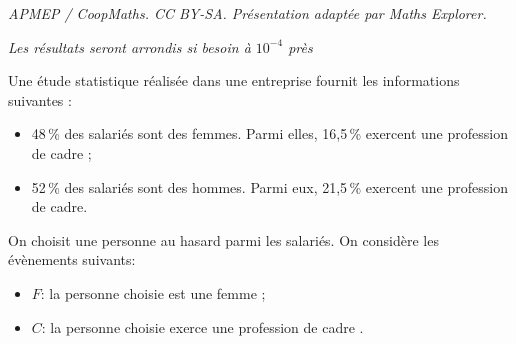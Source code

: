 \documentclass[10pt]{article}
\begin{document}
\noindent\textit{APMEP / CoopMaths. CC BY-SA. Présentation adaptée par Maths Explorer.}\par\medskip
\medskip

\emph{Les résultats seront arrondis si besoin à $10^{- 4}$ près}

\medskip

Une étude statistique réalisée dans une entreprise fournit les informations suivantes : 

\setlength\parindent{1cm}
\begin{itemize}
\item[$\bullet~~$] 48\,\% des salariés sont des femmes. Parmi elles, 16,5\,\% exercent une
profession de cadre ;
\item[$\bullet~~$] 52\,\% des salariés sont des hommes. Parmi eux, 21,5\,\% exercent une
profession de cadre.
\end{itemize}
\setlength\parindent{0cm}

\medskip

On choisit une personne au hasard parmi les salariés. On considère les évènements suivants:

\setlength\parindent{1cm}
\begin{itemize}
\item[$\bullet~~$] $F$: \og la personne choisie est une femme \fg{} ;
\item[$\bullet~~$] $C$: \og la personne choisie exerce une profession de cadre \fg.
\end{itemize}
\setlength\parindent{0cm}

\medskip
\end{document}
